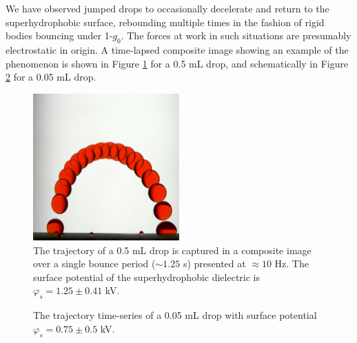 \documentclass[aip,reprint, floatfix]{revtex4-1}
\begin{document}
We have observed jumped drops to occasionally decelerate and return to the superhydrophobic surface, rebounding multiple times in the fashion of rigid bodies bouncing under 1-$g_0$. The forces at work in such situations are presumably electrostatic in origin. A time-lapsed composite image showing an example of the phenomenon is shown in Figure \ref{fig:bounce} for a 0.5 mL drop, and schematically in Figure \ref{fig:bounce_time} for a 0.05 mL drop.
\begin{figure}[htb]
\centering
\includegraphics[width=0.5\textwidth]{bounce}
\caption{The trajectory of a 0.5 mL drop is captured in a composite image over a single bounce period ($\sim 1.25$ s) presented at $\approx 10$ Hz. The surface potential of the superhydrophobic dielectric is $\varphi_s = 1.25 \pm 0.41$ kV. \label{fig:bounce}}
\end{figure}

\begin{figure}[htb]
\centering
\resizebox{0.5\textwidth}{!}{}
\caption{The trajectory time-series of a 0.05 mL drop with surface potential $\varphi_s = 0.75 \pm 0.5$ kV. \label{fig:bounce_time}}
\end{figure}
\end{document}
